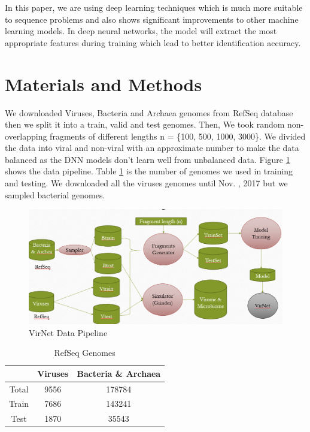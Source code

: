 \documentclass[conference]{IEEEtran}
\begin{document}
In this paper, we are using deep learning techniques which is much more suitable to sequence problems and also shows significant improvements to other machine learning models. In deep neural networks, the model will extract the most appropriate features during training which lead to better identification accuracy. 

\section{Materials and Methods}

We downloaded Viruses, Bacteria and Archaea genomes from RefSeq database then we split it into a train, valid and test genomes. Then, We took random non-overlapping fragments of different lengths n = \{100, 500, 1000, 3000\}. We divided the data into viral and non-viral with an approximate number to make the data balanced as the DNN models don't learn well from unbalanced data. Figure \ref{fig:data_pipline} shows the data pipeline. Table \ref{table:genome_stats} is the number of genomes we used in training and testing. We downloaded all the viruses genomes until Nov. , 2017 but we sampled bacterial genomes.

\begin{figure}
	\includegraphics[width=\linewidth]{imgs/data_pipeline.PNG}
	\caption{VirNet Data Pipeline}
	\label{fig:data_pipline}
\end{figure}

\begin{table}[h!]
	\centering
	\begin{tabular}{||c c c||} 
		& Viruses & Bacteria \& Archaea \\ [0.5ex] 
		\hline\hline
		Total & 9556  & 178784  \\ 
		Train & 7686  & 143241  \\
		Test & 1870  & 35543  \\ [1ex] 
	\end{tabular}
	\caption{RefSeq Genomes}
	\label{table:genome_stats}
\end{table}
\end{document}
